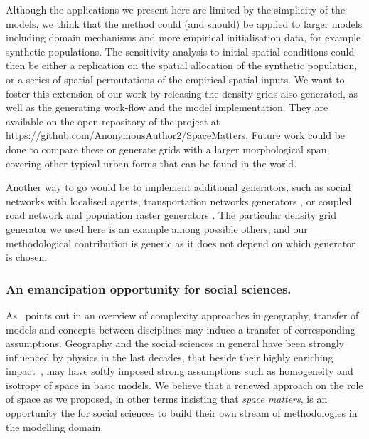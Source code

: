 \documentclass{JASSS}
\begin{document}
Although the applications we present here are limited by the simplicity of the models, we think that the method could (and should) be applied to larger models including domain mechanisms and more empirical initialisation data, for example synthetic populations. The sensitivity analysis to initial spatial conditions could then be either a replication on the spatial allocation of the synthetic population, or a series of spatial permutations of the empirical spatial inputs.
We want to foster this extension of our work by releasing the density grids also generated, as well as the generating work-flow and the model implementation. They are available on the open repository of the project at \url{https://github.com/AnonymousAuthor2/SpaceMatters}. Future work could be done to compare these or generate grids with a larger morphological span, covering other typical urban forms that can be found in the world.

Another way to go would be to implement additional generators, such as social networks \citep{alizadeh2016generating} with localised agents, transportation networks generators \citep{raimbault2018multi}, or coupled road network and population raster generators \citep{raimbault2019urban}. The particular density grid generator we used here is an example among possible others, and our methodological contribution is generic as it does not depend on which generator is chosen.  


\subsubsection{An emancipation opportunity for social sciences.}


As~\citet{pumain2003approche} points out in an overview of complexity approaches in geography, transfer of models and concepts between disciplines may induce a transfer of corresponding assumptions. Geography and the social sciences in general have been strongly influenced by physics in the last decades, that beside their highly enriching impact~\citep{o2015physicists}, may have softly imposed strong assumptions such as homogeneity and isotropy of space in basic models. We believe that a renewed approach on the role of space as we proposed, in other terms insisting that \emph{space matters}, is an opportunity the for social sciences to build their own stream of methodologies in the modelling domain.
\end{document}
